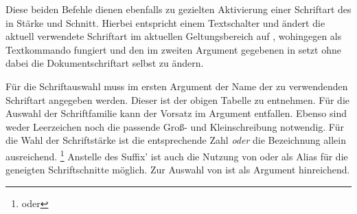 \begin{Declaration}[v2.04]{}
\begin{Declaration}[v2.04]{%
}
\printdeclarationlist
Diese beiden Befehle dienen ebenfalls zu gezielten Aktivierung einer Schriftart 
des \CDs in Stärke und Schnitt. Hierbei entspricht  einem 
Textschalter und ändert die aktuell verwendete Schriftart im aktuellen 
Geltungsbereich auf , wohingegen  als 
Textkommando fungiert und den im zweiten Argument gegebenen  in 
 setzt ohne dabei die Dokumentschriftart selbst zu ändern.

Für die Schriftauswahl muss im ersten Argument der Name der zu verwendenden 
Schriftart angegeben werden. Dieser ist der obigen Tabelle zu entnehmen. Für 
die Auswahl der Schriftfamilie \Univers kann der Vorsatz  im 
Argument  entfallen. Ebenso sind weder Leerzeichen noch die 
passende Groß- und Kleinschreibung notwendig. Für die Wahl der Schriftstärke 
ist die entsprechende Zahl \emph{oder} die Bezeichnung allein ausreichend.%
\footnote{ oder }
Anstelle des Suffix'  ist auch die Nutzung von  
oder  als Alias für die geneigten Schriftschnitte möglich. Zur 
Auswahl von \DIN ist  als Argument hinreichend.

\end{Declaration}
\end{Declaration}


